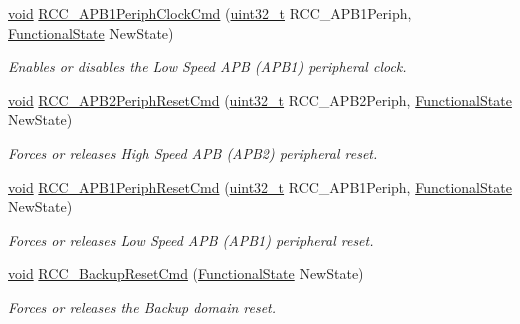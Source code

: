 \begin{DoxyCompactItemize}
\hyperlink{usb__devapi_8h_afabf60e7f57651d6d595a02c75f07cd0}{void} \hyperlink{group___r_c_c___private___functions_gaee7cc5d73af7fe1986fceff8afd3973e}{R\+C\+C\+\_\+\+A\+P\+B1\+Periph\+Clock\+Cmd} (\hyperlink{_p_e___types_8h_a33594304e786b158f3fb30289278f5af}{uint32\+\_\+t} R\+C\+C\+\_\+\+A\+P\+B1\+Periph, \hyperlink{agilefox_2library_2inc_2stm32f10x__type_8h_ac9a7e9a35d2513ec15c3b537aaa4fba1}{Functional\+State} New\+State)
\begin{DoxyCompactList}\small\item\em Enables or disables the Low Speed A\+PB (A\+P\+B1) peripheral clock. \end{DoxyCompactList}\item 
\hyperlink{usb__devapi_8h_afabf60e7f57651d6d595a02c75f07cd0}{void} \hyperlink{group___r_c_c___private___functions_gad94553850ac07106a27ee85fec37efdf}{R\+C\+C\+\_\+\+A\+P\+B2\+Periph\+Reset\+Cmd} (\hyperlink{_p_e___types_8h_a33594304e786b158f3fb30289278f5af}{uint32\+\_\+t} R\+C\+C\+\_\+\+A\+P\+B2\+Periph, \hyperlink{agilefox_2library_2inc_2stm32f10x__type_8h_ac9a7e9a35d2513ec15c3b537aaa4fba1}{Functional\+State} New\+State)
\begin{DoxyCompactList}\small\item\em Forces or releases High Speed A\+PB (A\+P\+B2) peripheral reset. \end{DoxyCompactList}\item 
\hyperlink{usb__devapi_8h_afabf60e7f57651d6d595a02c75f07cd0}{void} \hyperlink{group___r_c_c___private___functions_gab197ae4369c10b92640a733b40ed2801}{R\+C\+C\+\_\+\+A\+P\+B1\+Periph\+Reset\+Cmd} (\hyperlink{_p_e___types_8h_a33594304e786b158f3fb30289278f5af}{uint32\+\_\+t} R\+C\+C\+\_\+\+A\+P\+B1\+Periph, \hyperlink{agilefox_2library_2inc_2stm32f10x__type_8h_ac9a7e9a35d2513ec15c3b537aaa4fba1}{Functional\+State} New\+State)
\begin{DoxyCompactList}\small\item\em Forces or releases Low Speed A\+PB (A\+P\+B1) peripheral reset. \end{DoxyCompactList}\item 
\hyperlink{usb__devapi_8h_afabf60e7f57651d6d595a02c75f07cd0}{void} \hyperlink{group___r_c_c___private___functions_ga636c3b72f35391e67f12a551b15fa54a}{R\+C\+C\+\_\+\+Backup\+Reset\+Cmd} (\hyperlink{agilefox_2library_2inc_2stm32f10x__type_8h_ac9a7e9a35d2513ec15c3b537aaa4fba1}{Functional\+State} New\+State)
\begin{DoxyCompactList}\small\item\em Forces or releases the Backup domain reset. \end{DoxyCompactList}\item 

\end{DoxyCompactItemize}
